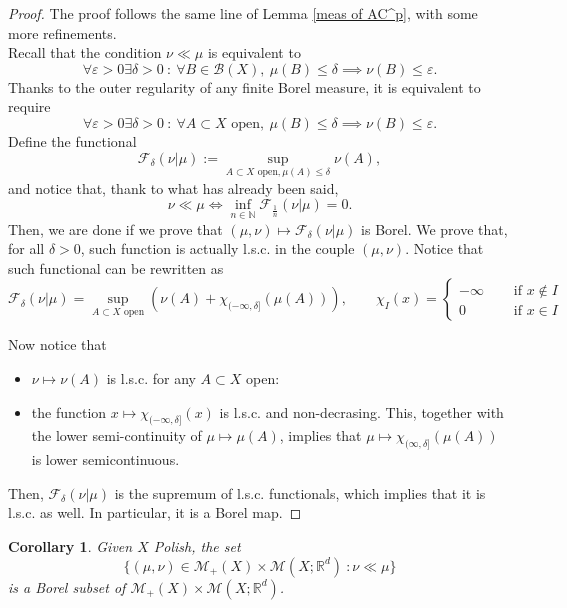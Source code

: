 \documentclass[10pt,leqno]{amsart}
\numberwithin{equation}{section}
\newtheorem{co}[teorema]{Corollary}
\newcommand{\R}{\mathbb{R}}
\newcommand{\N}{\mathbb{N}}
\begin{document}
\begin{proof}
    The proof follows the same line of Lemma \ref{meas of AC^p}, with some more refinements. 
    \\
    Recall that the condition $\nu \ll \mu$ is equivalent to 
    \[\forall\varepsilon>0 \exists \delta>0 \ : \ \forall B\in\mathcal{B}(X), \ \mu(B)\leq \delta \implies \nu(B)\leq \varepsilon.\]
    Thanks to the outer regularity of any finite Borel measure, it is equivalent to require
    \[\forall\varepsilon>0 \exists \delta>0 \ : \ \forall A\subset X \text{ open}, \ \mu(B)\leq \delta \implies \nu(B)\leq \varepsilon.\]
    Define the functional
    \[\mathcal{F}_\delta(\nu | \mu) := \sup_{A\subset X \text{ open}, \mu(A)\leq \delta} \nu(A),\]
    and notice that, thank to what has already been said, 
    \[\nu \ll \mu \iff \inf_{n\in\N} \mathcal{F}_{\frac{1}{n}}(\nu|\mu) =0.\]
    Then, we are done if we prove that $(\mu,\nu) \mapsto \mathcal{F}_\delta(\nu|\mu)$ is Borel. We prove that, for all $\delta>0$, such function is actually l.s.c. in the couple $(\mu,\nu)$. Notice that such functional can be rewritten as
    \[\mathcal{F}_{\delta}(\nu|\mu) = \sup_{A\subset X \text{ open}} \left( \nu(A) + \chi_{(-\infty,\delta]}(\mu(A)) \right),\qquad \chi_I(x) = 
    \begin{cases}
        -\infty \quad &\text{ if } x\notin I
        \\
        0 \quad &\text{ if } x\in I
    \end{cases}\]
   
    Now notice that 
    \begin{itemize}
        \item $\nu\mapsto \nu(A)$ is l.s.c. for any $A\subset X$ open:
        \item the function $x \mapsto \chi_{(-\infty,\delta]}(x)$ is l.s.c. and non-decrasing. This, together with the lower semi-continuity of $\mu\mapsto \mu(A)$, implies that 
        $\mu\mapsto \chi_{(\infty,\delta]}(\mu(A))$ is lower semicontinuous.
    \end{itemize}
    Then, $\mathcal{F}_\delta(\nu|\mu)$ is the supremum of l.s.c. functionals, which implies that it is l.s.c. as well. In particular, it is a Borel map.
\end{proof}

\begin{co}\label{abs cont meas R^d}
    Given $X$ Polish, the set 
    \[\{(\mu,\nu) \in \mathcal{M}_+(X) \times \mathcal{M}(X;\R^d) \ : \nu\ll\mu\}\]
    is a Borel subset of $\mathcal{M}_+(X)\times\mathcal{M}(X;\R^d)$.
\end{co}
\end{document}
